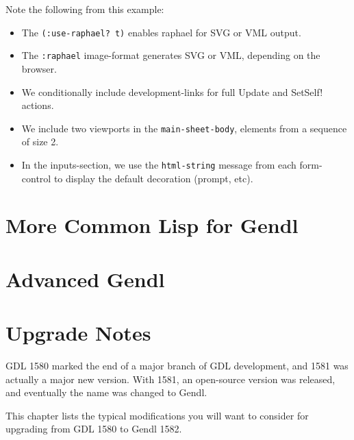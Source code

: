 \documentclass [11pt]{book}
\begin{document}
Note the following from this example:

\begin{itemize}

\item The \texttt{(:use-raphael? t)} enables raphael for SVG or VML output.

\item The \texttt{:raphael} image-format generates SVG or VML, depending on the browser.

\item We conditionally include development-links for full Update and SetSelf! actions.

\item We include two viewports in the \texttt{main-sheet-body}, elements from a sequence of size 2.

\item In the inputs-section, we use
                  the \texttt{html-string} message from each
                  form-control to display the default
                  decoration (prompt, etc).

\end{itemize}





\chapter{More Common Lisp for Gendl}

\label{chap:morecommonlispforgendl}



\chapter{Advanced Gendl}

\label{chap:advancedgendl}



\chapter*{Upgrade Notes}

\label{chap:upgradenotes}

GDL 1580 marked the end of a major branch of GDL development,
and 1581 was actually a major new version. With 1581, an open-source
version was released, and eventually the name was changed to
Gendl. 

This chapter lists the typical modifications you will want to consider
for upgrading from GDL 1580 to Gendl 1582.
\end{document}
